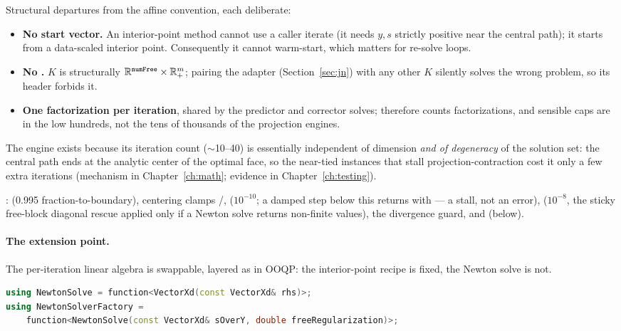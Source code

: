 Structural departures from the affine convention, each deliberate:
\begin{itemize}
\item \textbf{No start vector.} An interior-point method cannot use a caller
  iterate (it needs $y, s$ strictly positive near the central path); it
  starts from a data-scaled interior point. Consequently it cannot
  warm-start, which matters for re-solve loops.
\item \textbf{No .} $K$ is structurally
  $\mathbb{R}^{\texttt{numFree}} \times \mathbb{R}^{m}_{+}$; pairing the
  adapter (Section~\ref{sec:jn}) with any other $K$ silently solves the
  wrong problem, so its header forbids it.
\item \textbf{One factorization per iteration}, shared by the predictor and
  corrector solves;  therefore counts factorizations, and
  sensible caps are in the low hundreds, not the tens of thousands of the
  projection engines.
\end{itemize}

The engine exists because its iteration count ($\sim$10--40) is essentially
independent of dimension \emph{and of degeneracy} of the solution set:
the central path ends at the analytic center of the optimal face, so the
near-tied instances that stall projection-contraction cost it only a few
extra iterations (mechanism in Chapter~\ref{ch:math}; evidence in
Chapter~\ref{ch:testing}).

:  (0.995 fraction-to-boundary),
centering clamps /, 
($10^{-10}$; a damped step below this returns with
 --- a stall, not an error), 
($10^{-8}$, the sticky free-block diagonal rescue applied only if a Newton
solve returns non-finite values), the divergence guard, and
 (below).

\paragraph{The  extension point.} The
per-iteration linear algebra is swappable, layered as in OOQP: the
interior-point recipe is fixed, the Newton solve is not.

\begin{lstlisting}[language=C++]
using NewtonSolve = function<VectorXd(const VectorXd& rhs)>;
using NewtonSolverFactory =
    function<NewtonSolve(const VectorXd& sOverY, double freeRegularization)>;
\end{lstlisting}

